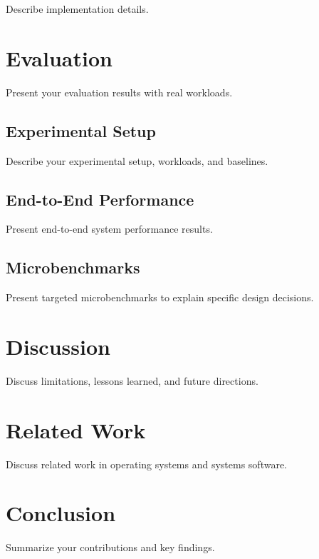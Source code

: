 \documentclass[sigplan,10pt]{acmart}
\begin{document}
Describe implementation details.

\section{Evaluation}
\label{sec:evaluation}

Present your evaluation results with real workloads.

\subsection{Experimental Setup}

Describe your experimental setup, workloads, and baselines.

\subsection{End-to-End Performance}

Present end-to-end system performance results.

\subsection{Microbenchmarks}

Present targeted microbenchmarks to explain specific design decisions.

\section{Discussion}
\label{sec:discussion}

Discuss limitations, lessons learned, and future directions.

\section{Related Work}
\label{sec:related}

Discuss related work in operating systems and systems software.

\section{Conclusion}
\label{sec:conclusion}

Summarize your contributions and key findings.




\end{document}
